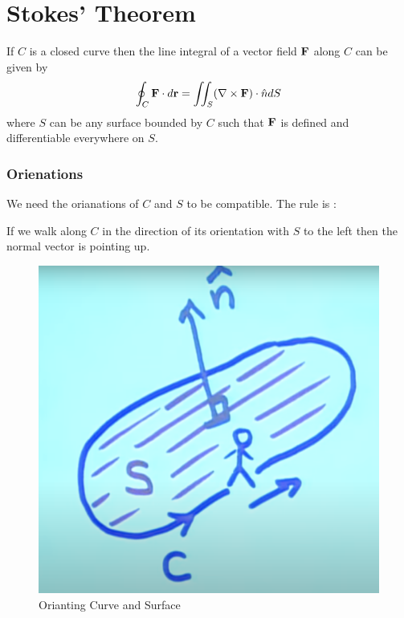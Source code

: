 

\chapter{Stokes' Theorem} 

\bigbreak

\begin{mdframed}
\begin{center}
If $C$ is a closed curve then the line integral of a vector field ${\bf F}$ along $C$ can be given by
$$ \oint_{C} {\bf F} \cdot d{\bf r} = \iint_S (\nabla \times {\bf F}) \cdot \hat{n} dS $$
where $S$ can be any surface bounded by $C$ such that ${\bf F}$ is defined and differentiable everywhere on $S$.
\end{center}
\end{mdframed} 

\subsection*{Orienations} 

We need the orianations of $C$ and $S$ to be compatible.
The rule is :

If we walk along $C$ in the direction of its orientation with $S$ to the left then the normal vector is pointing up.

\begin{figure}[ht!]
    \centering
    \includegraphics[scale=0.3]{./images/lecture_27_figure_1.png}
    \caption{Orianting Curve and Surface}
\end{figure}

